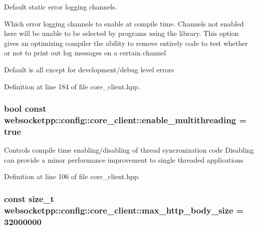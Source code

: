 Default static error logging channels. 

Which error logging channels to enable at compile time. Channels not enabled here will be unable to be selected by programs using the library. This option gives an optimizing compiler the ability to remove entirely code to test whether or not to print out log messages on a certain channel

Default is all except for development/debug level errors 

Definition at line 184 of file core\+\_\+client.\+hpp.

\subsubsection[{\texorpdfstring{enable\+\_\+multithreading}{enable\_multithreading}}]{\setlength{\rightskip}{0pt plus 5cm}bool const websocketpp\+::config\+::core\+\_\+client\+::enable\+\_\+multithreading = true\hspace{0.3cm}{\ttfamily [static]}}\hypertarget{structwebsocketpp_1_1config_1_1core__client_a20e354b545c8af8bd55ed076f42cb1d7}{}\label{structwebsocketpp_1_1config_1_1core__client_a20e354b545c8af8bd55ed076f42cb1d7}
Controls compile time enabling/disabling of thread syncronization code Disabling can provide a minor performance improvement to single threaded applications 

Definition at line 106 of file core\+\_\+client.\+hpp.

\subsubsection[{\texorpdfstring{max\+\_\+http\+\_\+body\+\_\+size}{max\_http\_body\_size}}]{\setlength{\rightskip}{0pt plus 5cm}const size\+\_\+t websocketpp\+::config\+::core\+\_\+client\+::max\+\_\+http\+\_\+body\+\_\+size = 32000000\hspace{0.3cm}{\ttfamily [static]}}\hypertarget{structwebsocketpp_1_1config_1_1core__client_a4b68db9b245ec097555f7e99842d96b3}{}\label{structwebsocketpp_1_1config_1_1core__client_a4b68db9b245ec097555f7e99842d96b3}


